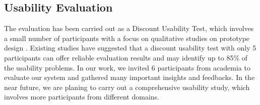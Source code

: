 \documentclass[]{sigchi}
\begin{document}
 






\subsection{Usability Evaluation}

The evaluation has been carried out as a Discount Usability Test, which involves a small number of participants with a focus on qualitative studies on prototype design \cite{nielsen1989usability}. Existing studies \cite{nielsen2015you}\cite{nielsen2009discount} have suggested that a discount usability test with only 5 participants can offer reliable evaluation results and may identify up to 85\% of the usability problems. In our work, we invited 6 participants from academia to evaluate our system and gathered many important insights and feedbacks.
In the near future, we are planing to carry out a comprehensive usability study, which involves more participants from different domains.
\end{document}
